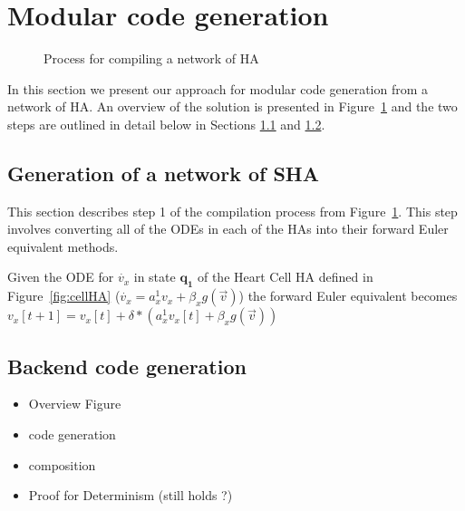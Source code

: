 \section{Modular code generation}
\label{sec:codeGen}

\begin{figure}[t!]
	\centering
	\scalebox{0.7}{
		
	}
	\caption{Process for compiling a network of \acf{HA}}
	\label{fig:compilingHA}
\end{figure}

%	

In this section we present our approach for modular code generation from
a network of \ac{HA}. 
An overview of the solution is presented in Figure~\ref{fig:compilingHA} and the two steps are outlined in detail below in Sections \ref{sec:shaGeneration} and \ref{sec:backendCodeGeneration}.

\subsection{Generation of a network of \ac{SHA}}
\label{sec:shaGeneration}

This section describes step 1 of the compilation process from Figure~\ref{fig:compilingHA}.
This step involves converting all of the \acp{ODE} in each of the \acp{HA} into their forward Euler equivalent methods.

Given the \ac{ODE} for $\dot{v_x}$ in state $\mathbf{q_1}$ of the Heart Cell \ac{HA} defined in Figure~\ref{fig:cellHA} ($\dot{v_x} = a^1_x v_x + \beta_x g(\vec{v})$) the forward Euler equivalent becomes $v_x[t+1] = v_x[t] + \delta * (a^1_x v_x[t] + \beta_x g(\vec{v}))$

\subsection{Backend code generation}
\label{sec:backendCodeGeneration}

\begin{itemize}
	\item Overview Figure
	\item code generation
	\item composition
	\item Proof for Determinism (still holds ?)
\end{itemize}